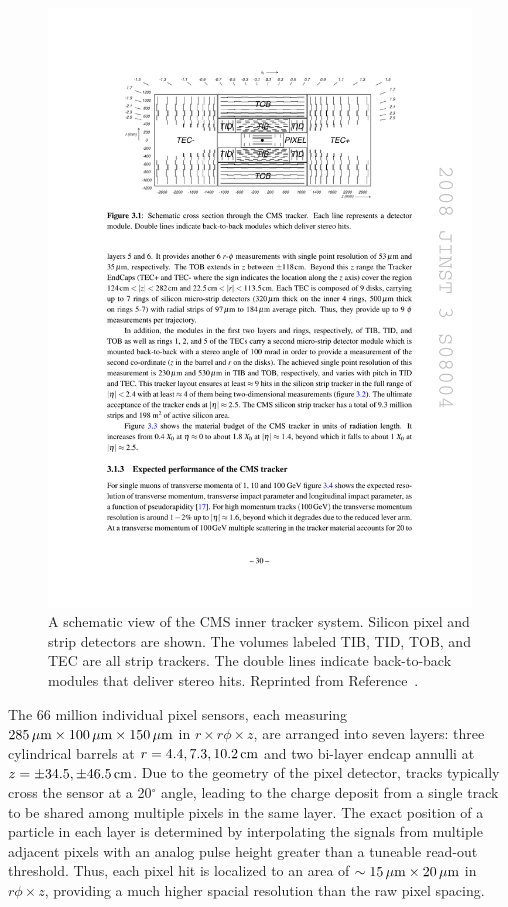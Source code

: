 \begin{figure}[htbp]
  \centering
  \includegraphics[width=\textwidth]{Detector/Figures/cms_tracker.pdf}
  \caption{
    A schematic view of the CMS inner tracker system.
    Silicon pixel and strip detectors are shown.
    The volumes labeled TIB, TID, TOB, and TEC are all strip trackers.
    The double lines indicate back-to-back modules that deliver stereo hits.
    Reprinted from Reference~\cite{CMS2008}. 
  }
  \label{fig:cms_tracker}
\end{figure}

The 66 million individual pixel sensors, each measuring $285\,\mu\text{m}\times 100\,\mu\text{m}\times 150\,\mu\text{m}$ in $r\times r\phi \times z$, are arranged into seven layers: three cylindrical barrels at $r = 4.4, 7.3, 10.2\,\text{cm}$ and two bi-layer endcap annulli at $z = \pm34.5, \pm46.5 \,\text{cm}$.
Due to the geometry of the pixel detector, tracks typically cross the sensor at a 20$^\circ$ angle, leading to the charge deposit from a single track to be shared among multiple pixels in the same layer.
The exact position of a particle in each layer is determined by interpolating the signals from multiple adjacent pixels with an analog pulse height greater than a tuneable read-out threshold.
Thus, each pixel hit is localized to an area of $\sim 15 \,\mu\text{m}\times 20\,\mu\text{m}$ in $r\phi \times z$, providing a much higher spacial resolution than the raw pixel spacing.

